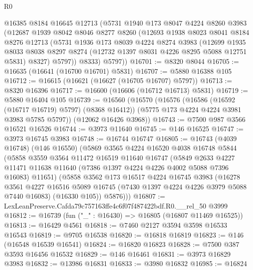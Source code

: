 \begin{lexlean}{R0}
\begin{coremodule}
      @16385
      @8184
      @16645
      @12713
      (@5731
        @1940
        @173
        @8047
        @4224
        @8260
        @3983
        (@12687
          @1939
          @8042
          @8046
          @8277
          @8260
          (@12693
            @1938
            @8023
            @8041
            @8184
            @8276
            @12713
            (@5731
              @1936
              @173
              @8039
              @4224
              @8274
              @3983
              (@12699
                @1935
                @8033
                @8038
                @8297
                @8274
                (@12732 @1397 @8031 @4226 @8295 @5088 @12751 @5831)
                @8327)
              @5797))
          @8333)
        @5797))
@16701 := @8320 @8044
@16705 := @16635 (@16641 (@16700 @16701) @5831)
@16707 := @5880 @16388 @105
@16712 := @16615 (@16621 (@16627 (@16705 @16707) @5797))
@16713 := @8320 @16396
@16717 := @16600 (@16606 (@16712 @16713) @5831)
@16719 := @5880 @16404 @105
@16739 := @16560
    (@16570
      (@16576
        (@16586 (@16592 (@16717 @16719) @5797) (@8368 @16412))
        (@5775 @173 @4224 @4224 @3981 @3983 @5785 @5797))
      (@12062 @16426 @3968))
@16743 := @7500 @987 @3566 @16521 @16526
@16744 := @3973 @11640
@16745 := @146 @16525
@16747 := @3973 @16745 @3983
@16748 := @16744 @16747
@16805 := @16743
    (@4039 @16748)
    (@146 @16550)
    (@5869
      @3565
      @4224
      @16520
      @4038
      @16748
      @5844
      (@5858
        @3559
        @3564
        @11472
        @16519
        @11640
        @16747
        (@5849
          @2633
          @4227
          @11471
          @11638
          @11640
          (@7386 @1397 @4224 @4226 @4002 @5088 @7396 @16083)
          @11651)
        (@5858
          @3562
          @173
          @16517
          @4224
          @16745
          @3983
          (@16278
            @3561
            @4227
            @16516
            @5089
            @16745
            (@7430 @1397 @4224 @4226 @3979 @5088 @7440 @16083)
            (@16330 @105))
          @5876)))
@16807 := LexLeanPreserve.Cafda79c757163ffe4c6f07f487422bdf.R0.__rel_50 @3999
@16812 := @16739 (fun ("_" : @16430) => @16805 (@16807 @11469 @16525))
@16813 := @16429 @4561
@16818 := @7460 @2127 @3594 @3598 @16533 @16543
@16819 := @9705 @16538
@16820 := @16818 @16819
@16823 := @146 (@16548 @16539 @16541)
@16824 := @16820 @16823
@16828 := @7500 @387 @3593 @16456 @16532
@16829 := @146 @16461
@16831 := @3973 @16829 @3983
@16832 := @13986 @16831
@16833 := @3980 @16832
@16985 := @16824

\end{coremodule}
\end{lexlean}
